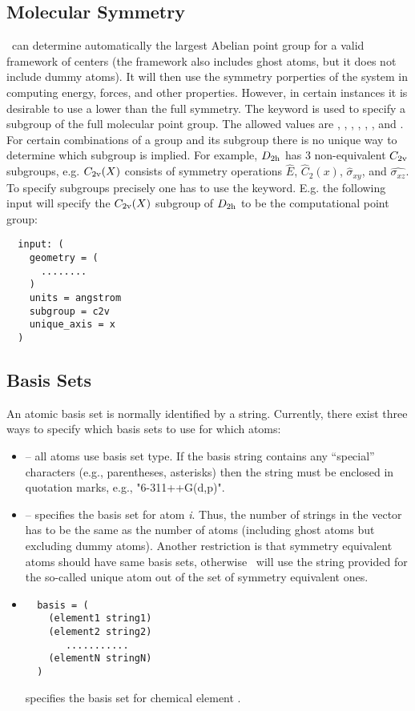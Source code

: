 \subsection{Molecular Symmetry}
\PSIthree\ can determine automatically the largest Abelian point group
for a valid framework of centers (the framework also includes ghost
atoms, but it does not include dummy atoms).
It will then use the symmetry porperties of the system in computing energy,
forces, and other properties.
However, in certain instances it is desirable to use a lower than the
full symmetry. The keyword  is used to specify a subgroup of
the full molecular point group. The allowed values are ,
, , , , ,
and . For certain combinations of a group and
its subgroup there is no unique way to determine which subgroup is
implied. For example, $D_{\rm 2h}$ has 3 non-equivalent $C_{\rm 2v}$ subgroups,
e.g. $C_{\rm 2v}(X)$ consists of symmetry operations $\hat{E}$, $\hat{C}_2(x)$,
$\hat{\sigma}_{xy}$, and $\hat{\sigma_{xz}}$. 
To specify subgroups precisely one has to use the 
keyword. E.g. the following input will specify the $C_{\rm 2v}(X)$
subgroup of $D_{\rm 2h}$ to be the computational point group:
\begin{verbatim}
  input: (
    geometry = (
      ........
    )
    units = angstrom
    subgroup = c2v
    unique_axis = x
  )
\end{verbatim}

\subsection{Basis Sets}
An atomic basis set is normally identified by a
string. Currently, there exist three ways to specify which basis sets
to use for which atoms:
\begin{itemize}
\item {} -- all atoms use basis set type.  If the
basis string contains any ``special'' characters (e.g., parentheses, 
asterisks) then the string must be enclosed in quotation marks, e.g.,
"6-311++G(d,p)".
\item {} -- 
specifies the basis set for atom {\em i}. Thus, the number of strings
in the  vector has to be the same as the number of
atoms (including ghost atoms but excluding dummy atoms). Another
restriction is that symmetry equivalent atoms should have same basis
sets, otherwise \PSIinput\ will use the string provided for the
so-called unique atom out of the set of symmetry equivalent ones.
\item 
\begin{verbatim}
  basis = (
    (element1 string1)
    (element2 string2)
       ...........
    (elementN stringN)
  )
\end{verbatim}
 specifies the basis set for chemical element 
.
\end{itemize}

